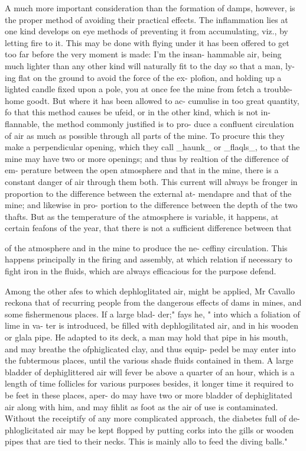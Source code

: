 \documentclass{article}
\begin{document}
A much more important consideration than the formation of damps, however, is the proper method of avoiding their practical effects. The inflammation lies at one kind develops on eye methods of preventing it from accumulating, viz., by letting fire to it. This may be done with flying under it has been offered to get too far before the very moment is made: I’m the insan- hammable air, being much lighter than any other kind will naturally fit to the day so that a man, ly- ing flat on the ground to avoid the force of the ex- plofion, and holding up a lighted candle fixed upon a pole, you at once fee the mine from fetch a trouble- home goodt. But where it has been allowed to ac- cumulise in too great quantity, fo that this method causes be ufeid, or in the other kind, which is not in- flannable, the method commonly justified is to pro- duce a confluent circulation of air as much as possible through all parts of the mine. To procure this they make a perpendicular opening, which they call \_haunk\_ or \_flaqls\_, to that the mine may have two or more openings; and thus by realtion of the difference of em- perature between the open atmosphere and that in the mine, there is a constant danger of air through them both. This current will always be fronger in proportion to the difference between the external at- mendapre and that of the mine; and likewise in pro- portion to the difference between the depth of the two thafts. But as the temperature of the atmosphere is variable, it happens, at certain feafons of the year, that there is not a sufficient difference between that

of the atmosphere and in the mine to produce the ne- ceffiny circulation. This happens principally in the firing and assembly, at which relation if necessary to fight iron in the fluids, which are always efficacious for the purpose defend.

Among the other afes to which dephloglitated air, might be applied, Mr Cavallo reckona that of recurring people from the dangerous effects of dams in mines, and some fishermenous places. If a large blad- der;" fays he, " into which a foliation of lime in va- ter is introduced, be filled with dephlogilitated air, and in his wooden or glala pipe. He adapted to its deck, a man may hold that pipe in his mouth, and may breathe the ofphiglicated clay, and thus equip- pedel be may enter into the fubtermous places, until the various shade fluids contained in them. A large bladder of dephiglittered air will fever be above a quarter of an hour, which is a length of time follicles for various purposes besides, it longer time it required to be feet in these places, aper- do may have two or more bladder of dephiglitated air along with him, and may fihlit as foot as the air of use is contaminated. Without the receiptify of any more complicated approach, the diabetes full of de- phloglicitated air may be kept flopped by putting corks into the gills or wooden pipes that are tied to their necks. This is mainly allo to feed the diving balls."
\end{document}
